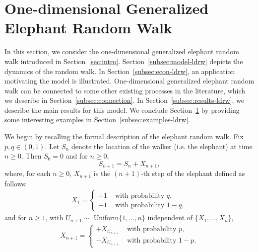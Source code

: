 \documentclass[12pt]{amsart}
\theoremstyle{plain}
\theoremstyle{remark}
\numberwithin{equation}{section}
\begin{document}
\section{One-dimensional Generalized Elephant Random Walk}\label{sec:ldrw}

In this section, we consider the one-dimensional generalized elephant random walk introduced in Section~\ref{sec:intro}. Section~\ref{subsec:model-ldrw} depicts the dynamics of the 
random walk. In Section~\ref{subsec:econ-ldrw}, an application motivating the model is illustrated. One-dimensional generalized elephant random walk can be connected to some other existing processes in the literature, which we describe in Section~\ref{subsec:connection}. In Section~\ref{subsec:results-ldrw}, we describe the main results for this model. We conclude Section~\ref{sec:ldrw} by providing some interesting examples in Section~\ref{subsec:examples-ldrw}. 

We begin by recalling the formal description of the elephant random walk. Fix $p,q \in (0,1)$. Let $S_n$ denote the location of the walker (i.e. the elephant) at time $n \geq 0$. Then $S_0 = 0$ and for $n\geq 0$, 
\[
    S_{n+1} = S_{n} + X_{n+1},
\]
where, for each $n \geq 0$, $X_{n+1}$ is the $(n+1)$-th step of the elephant defined as follows:
\begin{align}\label{eq00}
           X_1 = \begin{cases}
               + 1 &\text{ with probability } q, \\ 
               - 1 &\text{ with probability } 1-q,
           \end{cases}
\end{align}
and for $n \geq 1$, with $U_{n+1} \sim$ Uniform$\{1, \ldots, n\}$ independent of $\{X_1, \ldots, X_n\}$,
\begin{align}\label{eq01}
           X_{n+1} = \begin{cases}
               + X_{U_{n+1}} &\text{ with probability } p, \\ 
               - X_{U_{n+1}} &\text{ with probability } 1-p.
           \end{cases}
\end{align}
\end{document}
